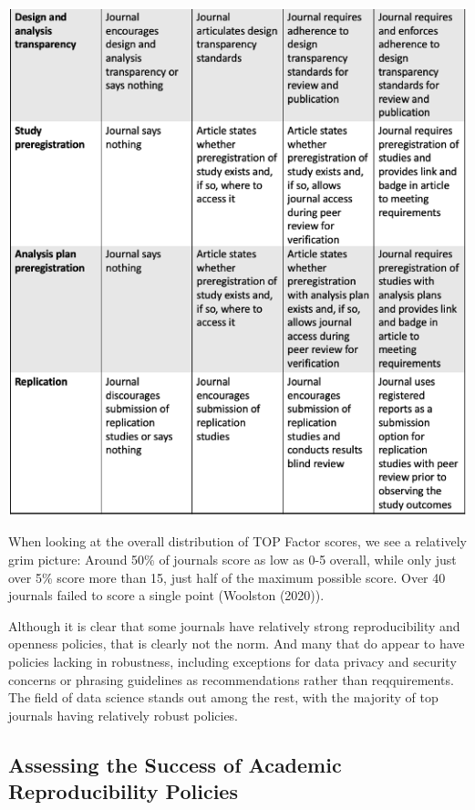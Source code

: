 \documentclass[12pt,twoside]{reedthesis}
\begin{document}
\begin{center}\includegraphics[width=1\linewidth]{figure/top-2} \end{center}

When looking at the overall distribution of TOP Factor scores, we see a
relatively grim picture: Around 50\% of journals score as low as 0-5
overall, while only just over 5\% score more than 15, just half of the
maximum possible score. Over 40 journals failed to score a single point
(Woolston (2020)).

Although it is clear that some journals have relatively strong
reproducibility and openness policies, that is clearly not the norm. And
many that do appear to have policies lacking in robustness, including
exceptions for data privacy and security concerns or phrasing guidelines
as recommendations rather than reqquirements. The field of data science
stands out among the rest, with the majority of top journals having
relatively robust policies.

\subsection{Assessing the Success of Academic Reproducibility
Policies}\label{assessing-the-success-of-academic-reproducibility-policies}
\end{document}
